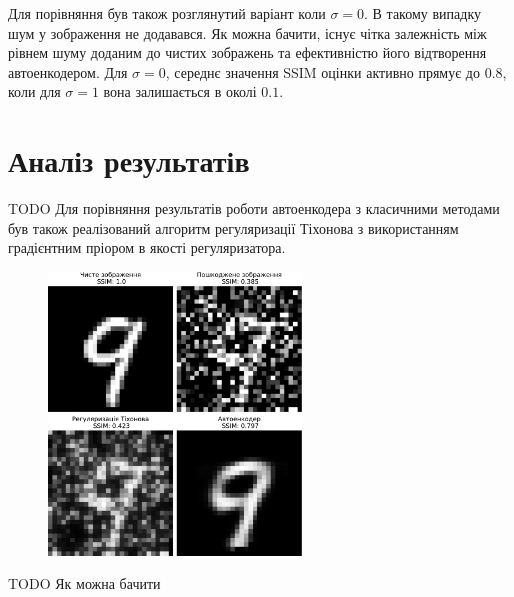 \documentclass[14pt,a4paper]{extarticle}
\newcounter{e}
\numberwithin{equation}{section}
\numberwithin{figure}{section}
\begin{document}
	Для порівняння був також розглянутий варіант коли $\sigma = 0$. В такому випадку шум у зображення не додавався. Як можна бачити, існує чітка залежність між рівнем шуму доданим до чистих зображень та ефективністю його відтворення автоенкодером. Для $\sigma = 0$, середнє значення SSIM оцінки активно прямує до 0.8, коли для $\sigma = 1$ вона залишається в околі $0.1$.

		
	\newpage
	\thispagestyle{empty}
	\section{Аналіз результатів}

	TODO
	Для порівняння результатів роботи автоенкодера з класичними методами був також реалізований алгоритм регуляризації Тіхонова з використанням градієнтним пріором в якості регуляризатора.
	
	\begin{figure}[H]
		\centering
		\includegraphics[width=0.6\textwidth]{resources/denoising-methods-comparation.pdf}
		\caption{}
		\label{fig:denoising-methods-comparation}
	\end{figure}
	
	TODO
	Як можна бачити 
	
\end{document}
